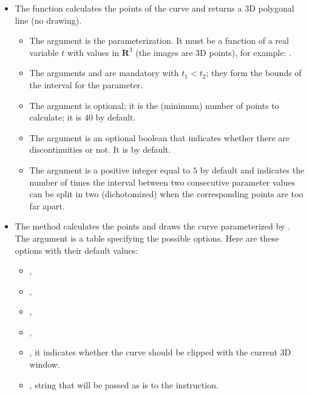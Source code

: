 \begin{itemize}
    \item The function  calculates the points of the curve and returns a 3D polygonal line (no drawing).
\begin{itemize}
    \item The argument  is the parameterization. It must be a function of a real variable $t$ with values ​​in $\mathbf R^3$ (the images are 3D points), for example:
.

    \item The arguments  and  are mandatory with \(t_1 < t_2\); they form the bounds of the interval for the parameter.

    \item The argument  is optional; it is the (minimum) number of points to calculate; it is $40$ by default.

    \item The argument  is an optional boolean that indicates whether there are discontinuities or not. It is \false by default.

    \item The argument  is a positive integer equal to $5$ by default and indicates the number of times the interval between two consecutive parameter values ​​can be split in two (dichotomized) when the corresponding points are too far apart.
\end{itemize}

    \item The method  calculates the points and draws the curve parameterized by . The argument  is a table specifying the possible options. Here are these options with their default values:

\begin{itemize}
    \item {},
    \item {}, 
    \item {},
    \item {},
    \item {}, it indicates whether the curve should be clipped with the current 3D window.     
    \item {}, string that will be passed as is to the \drawcmd instruction.
\end{itemize}
\end{itemize}

